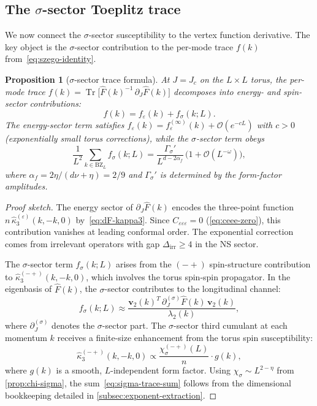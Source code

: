 \documentclass[11pt]{article}
\newtheorem{proposition}[theorem]{Proposition}
\theoremstyle{definition}
\theoremstyle{remark}
\newcommand{\Fish}{F}
\newcommand{\Jc}{J_c}
\newcommand{\BZ}{\mathrm{BZ}}
\newcommand{\Tr}{\operatorname{Tr}}
\newcommand{\cO}{\mathcal{O}}
\begin{document}
\subsection{The $\sigma$-sector Toeplitz trace}
\label{subsec:sigma-toeplitz-trace}

We now connect the $\sigma$-sector susceptibility to the
vertex function derivative. The key object is the
$\sigma$-sector contribution to the per-mode trace
$f(k)$ from~\eqref{eq:szego-identity}.

\begin{proposition}[$\sigma$-sector trace formula]
\label{prop:sigma-trace}
At $J = \Jc$ on the $L \times L$ torus, the per-mode trace
$f(k) = \Tr\bigl[\hat{\Fish}(k)^{-1}\,\partial_J\hat{\Fish}(k)\bigr]$
decomposes into energy- and spin-sector contributions:
\begin{equation}
  f(k) = f_\varepsilon(k) + f_\sigma(k; L).
  \label{eq:f-sector-decomposition}
\end{equation}
The energy-sector term satisfies $f_\varepsilon(k) = f_\varepsilon^{(\infty)}(k)
+ \cO(e^{-c L})$ with $c > 0$ (exponentially small torus corrections),
while the $\sigma$-sector term obeys
\begin{equation}
  \frac{1}{L^2}\sum_{k \in \BZ_L} f_\sigma(k; L)
    = \frac{\Gamma_\sigma'}{L^{d-2\alpha_f}}
      \,\bigl(1 + \cO(L^{-\omega})\bigr),
  \label{eq:sigma-trace-sum}
\end{equation}
where $\alpha_f = 2\eta/(d\nu + \eta) = 2/9$ and
$\Gamma_\sigma'$ is determined by the form-factor amplitudes.
\end{proposition}

\begin{proof}[Proof sketch]
The energy sector of $\partial_J\hat{\Fish}(k)$ encodes the
three-point function
$n\,\hat{\kappa}_3^{(\varepsilon)}(k, -k, 0)$
by~\eqref{eq:dF-kappa3}. Since
$C_{\varepsilon\varepsilon\varepsilon} = 0$
(\cref{eq:ceee-zero}), this contribution vanishes at
leading conformal order. The exponential correction comes
from irrelevant operators with gap $\Delta_{\mathrm{irr}} \geq 4$
in the NS sector.

The $\sigma$-sector term $f_\sigma(k; L)$ arises from the
$(-+)$ spin-structure contribution to
$\hat{\kappa}_3^{(-+)}(k, -k, 0)$, which involves the torus
spin-spin propagator.
In the eigenbasis of $\hat{\Fish}(k)$, the $\sigma$-sector
contributes to the longitudinal channel:
\[
  f_\sigma(k; L) \approx
    \frac{\mathbf{v}_2(k)^T\,\partial_J^{(\sigma)}
      \hat{\Fish}(k)\,\mathbf{v}_2(k)}{\lambda_2(k)},
\]
where $\partial_J^{(\sigma)}$ denotes the $\sigma$-sector part.
The $\sigma$-sector third cumulant at each momentum $k$ receives
a finite-size enhancement from the torus spin susceptibility:
\begin{equation}
  \hat{\kappa}_3^{(-+)}(k, -k, 0)
    \propto \frac{\chi_\sigma^{(-+)}(L)}{n}\cdot g(k),
  \label{eq:kappa3-chi-sigma}
\end{equation}
where $g(k)$ is a smooth, $L$-independent form factor.
Using $\chi_\sigma \sim L^{2-\eta}$ from
\cref{prop:chi-sigma}, the sum~\eqref{eq:sigma-trace-sum}
follows from the dimensional bookkeeping detailed in
\cref{subsec:exponent-extraction}.
\end{proof}
\end{document}
